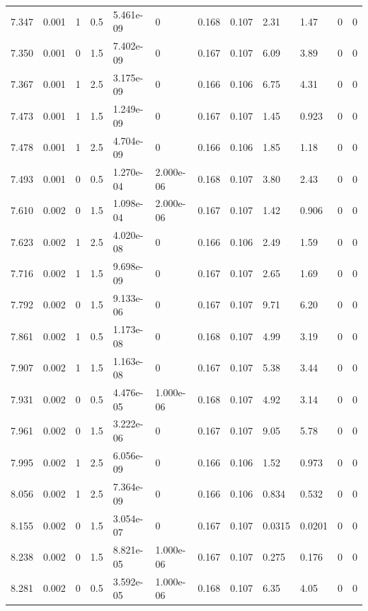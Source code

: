 \documentclass[preview]{standalone}
\begin{document}
{{{{{\begin{tabular}{L{1.2cm}C{1.2cm} C{0.3cm}C{0.5cm} C{1.4cm}C{1.4cm} C{1.4cm}C{1.4cm} C{1.6cm}C{1.6cm} C{1.6cm}C{1.6cm}}
  7.347  &  0.001  & 1     & 0.5 &  5.461e-09  & 0  &  0.168&   0.107& 2.31 & 1.47   &  0 & 0  \\ 
  7.350  &  0.001  & 0     & 1.5 &  7.402e-09  & 0  &  0.167&   0.107& 6.09 & 3.89   &  0 & 0  \\ 
  7.367  &  0.001  & 1     & 2.5 &  3.175e-09  & 0  &  0.166&   0.106& 6.75 & 4.31   &  0 & 0  \\ 
  7.473  &  0.001  & 1     & 1.5 &  1.249e-09  & 0  &  0.167&   0.107& 1.45 & 0.923   &  0 & 0  \\ 
  7.478  &  0.001  & 1     & 2.5 &  4.704e-09  & 0  &  0.166&   0.106& 1.85 & 1.18   &  0 & 0  \\ 
  7.493  &  0.001  & 0     & 0.5 &  1.270e-04  & 2.000e-06  &  0.168&   0.107& 3.80 & 2.43   &  0 & 0  \\ 
  7.610  &  0.002  & 0     & 1.5 &  1.098e-04  & 2.000e-06  &  0.167&   0.107& 1.42 & 0.906   &  0 & 0  \\ 
  7.623  &  0.002  & 1     & 2.5 &  4.020e-08  & 0  &  0.166&   0.106& 2.49 & 1.59   &  0 & 0  \\ 
  7.716  &  0.002  & 1     & 1.5 &  9.698e-09  & 0  &  0.167&   0.107& 2.65 & 1.69   &  0 & 0  \\ 
  7.792  &  0.002  & 0     & 1.5 &  9.133e-06  & 0  &  0.167&   0.107& 9.71 & 6.20   &  0 & 0  \\ 
  7.861  &  0.002  & 1     & 0.5 &  1.173e-08  & 0  &  0.168&   0.107& 4.99 & 3.19   &  0 & 0  \\ 
  7.907  &  0.002  & 1     & 1.5 &  1.163e-08  & 0  &  0.167&   0.107& 5.38 & 3.44   &  0 & 0  \\ 
  7.931  &  0.002  & 0     & 0.5 &  4.476e-05  & 1.000e-06  &  0.168&   0.107& 4.92 & 3.14   &  0 & 0  \\ 
  7.961  &  0.002  & 0     & 1.5 &  3.222e-06  & 0  &  0.167&   0.107& 9.05 & 5.78   &  0 & 0  \\ 
  7.995  &  0.002  & 1     & 2.5 &  6.056e-09  & 0  &  0.166&   0.106& 1.52 & 0.973   &  0 & 0  \\ 
  8.056  &  0.002  & 1     & 2.5 &  7.364e-09  & 0  &  0.166&   0.106& 0.834 & 0.532   &  0 & 0  \\ 
  8.155  &  0.002  & 0     & 1.5 &  3.054e-07  & 0  &  0.167&   0.107& 0.0315 & 0.0201   &  0 & 0  \\ 
  8.238  &  0.002  & 0     & 1.5 &  8.821e-05  & 1.000e-06  &  0.167&   0.107& 0.275 & 0.176   &  0 & 0  \\ 
  8.281  &  0.002  & 0     & 0.5 &  3.592e-05  & 1.000e-06  &  0.168&   0.107& 6.35 & 4.05   &  0 & 0  \\ 

\end{tabular}}}}}}
\end{document}
